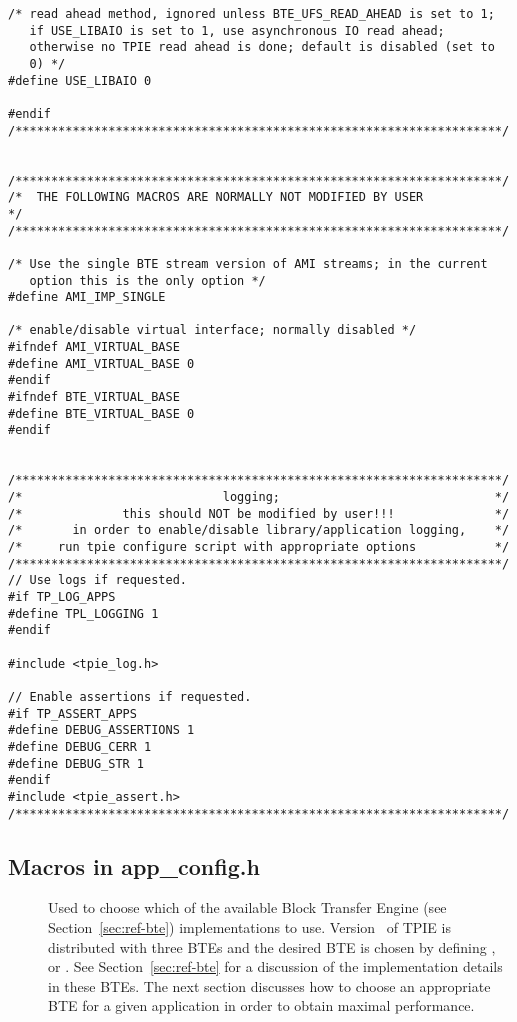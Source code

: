 \begin{verbatim}
/* read ahead method, ignored unless BTE_UFS_READ_AHEAD is set to 1;
   if USE_LIBAIO is set to 1, use asynchronous IO read ahead;
   otherwise no TPIE read ahead is done; default is disabled (set to
   0) */
#define USE_LIBAIO 0

#endif
/********************************************************************/


/********************************************************************/
/*  THE FOLLOWING MACROS ARE NORMALLY NOT MODIFIED BY USER           */
/********************************************************************/

/* Use the single BTE stream version of AMI streams; in the current
   option this is the only option */
#define AMI_IMP_SINGLE

/* enable/disable virtual interface; normally disabled */
#ifndef AMI_VIRTUAL_BASE
#define AMI_VIRTUAL_BASE 0
#endif
#ifndef BTE_VIRTUAL_BASE 
#define BTE_VIRTUAL_BASE 0
#endif


/********************************************************************/
/*                            logging;                              */
/*              this should NOT be modified by user!!!              */
/*       in order to enable/disable library/application logging,    */
/*     run tpie configure script with appropriate options           */
/********************************************************************/
// Use logs if requested.
#if TP_LOG_APPS
#define TPL_LOGGING 1
#endif

#include <tpie_log.h>

// Enable assertions if requested.
#if TP_ASSERT_APPS
#define DEBUG_ASSERTIONS 1
#define DEBUG_CERR 1
#define DEBUG_STR 1
#endif
#include <tpie_assert.h>
/********************************************************************/
\end{verbatim}

\subsection{Macros in app\_config.h}

\begin{description}
\item[{}] Used to choose which of the available Block
Transfer Engine (see Section~\ref{sec:ref-bte}) implementations to
use. Version \version~of TPIE is distributed with three BTEs and the
desired BTE is chosen by defining , 
or . See Section~\ref{sec:ref-bte} for a discussion of
the implementation details in these BTEs. The next section discusses how to
choose an appropriate BTE for a given application in order to obtain
maximal performance.

\end{description}

